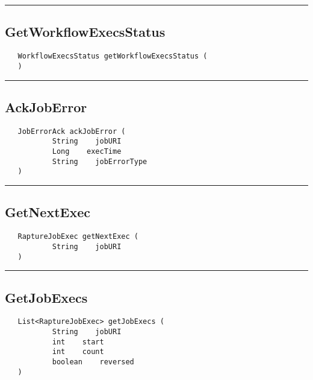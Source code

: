 \rule{15cm}{2pt}
\subsection{GetWorkflowExecsStatus}
\label{Api:GetWorkflowExecsStatus}
\begin{verbatim}
   WorkflowExecsStatus getWorkflowExecsStatus (
   )
\end{verbatim}



\rule{15cm}{2pt}
\subsection{AckJobError}
\label{Api:AckJobError}
\begin{verbatim}
   JobErrorAck ackJobError (
           String    jobURI
           Long    execTime
           String    jobErrorType
   )
\end{verbatim}



\rule{15cm}{2pt}
\subsection{GetNextExec}
\label{Api:GetNextExec}
\begin{verbatim}
   RaptureJobExec getNextExec (
           String    jobURI
   )
\end{verbatim}



\rule{15cm}{2pt}
\subsection{GetJobExecs}
\label{Api:GetJobExecs}
\begin{verbatim}
   List<RaptureJobExec> getJobExecs (
           String    jobURI
           int    start
           int    count
           boolean    reversed
   )
\end{verbatim}



